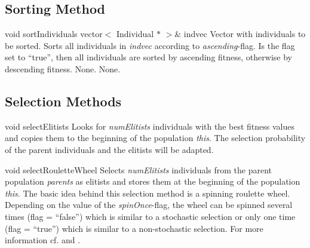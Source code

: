 \subsection{Sorting Method}

\setNormalInstance
\printMethodWithOneParam
{void}
{sortIndividuals}
{vector$<$ Individual $\ast$ $>$\&}
{indvec}
{Vector with individuals to be sorted.}
{Sorts all individuals in {\em indvec} according to
 {\em ascending}-flag. Is the flag set to ``true'', then all individuals
 are sorted by ascending fitness, otherwise by descending fitness.}
{None.}
{None.}

\clearpage

\subsection{Selection Methods}

\setNormalInstance
\setCorrectWidthThree{8pt}
\printMethodWithParamsSaved
{void}
{}
{selectElitists}
{Looks for {\em numElitists}
 individuals with the best fitness values and copies them to the
 beginning of the population {\em this}. The selection probability
 of the parent individuals and the elitists will be adapted.}
{}
\setCorrectWidthThree{4pt}

\vspace*{4ex}

\setNormalInstance
\setCorrectWidthThree{8pt}
\printMethodWithParamsSaved
{void}
{}
{selectRouletteWheel}
{Selects {\em numElitists} individuals from the parent population
 {\em parents} as elitists and stores them at the beginning of the
 population {\em this}. The basic idea behind this selection
 method is a spinning roulette wheel. Depending on the value of the 
 {\em spinOnce}-flag, the wheel can be spinned several times
 (flag = ``false'') which is similar to a stochastic selection or
 only one time (flag = ``true'') which is similar to a non-stochastic
 selection.
 For more information cf. \cite{Search} and \cite{Jong}.}
{}
\setCorrectWidthThree{4pt}


